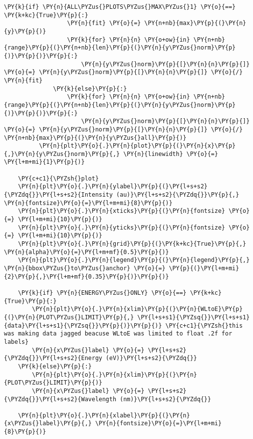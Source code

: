 \begin{tcolorbox}[breakable, size=fbox, boxrule=1pt, pad at break*=1mm,colback=cellbackground, colframe=cellborder]
\begin{Verbatim}[commandchars=\\\{\}]
              \PY{k}{if} \PY{n}{ALL\PYZus{}PLOTS\PYZus{}MAX\PYZus{}1} \PY{o}{==} \PY{k+kc}{True}\PY{p}{:}
                  \PY{n}{fit} \PY{o}{=} \PY{n+nb}{max}\PY{p}{(}\PY{n}{y}\PY{p}{)}
                  \PY{k}{for} \PY{n}{n} \PY{o+ow}{in} \PY{n+nb}{range}\PY{p}{(}\PY{n+nb}{len}\PY{p}{(}\PY{n}{y\PYZus{}norm}\PY{p}{)}\PY{p}{)}\PY{p}{:}
                      \PY{n}{y\PYZus{}norm}\PY{p}{[}\PY{n}{n}\PY{p}{]} \PY{o}{=} \PY{n}{y\PYZus{}norm}\PY{p}{[}\PY{n}{n}\PY{p}{]} \PY{o}{/} \PY{n}{fit}
              \PY{k}{else}\PY{p}{:}
                  \PY{k}{for} \PY{n}{n} \PY{o+ow}{in} \PY{n+nb}{range}\PY{p}{(}\PY{n+nb}{len}\PY{p}{(}\PY{n}{y\PYZus{}norm}\PY{p}{)}\PY{p}{)}\PY{p}{:}
                      \PY{n}{y\PYZus{}norm}\PY{p}{[}\PY{n}{n}\PY{p}{]} \PY{o}{=} \PY{n}{y\PYZus{}norm}\PY{p}{[}\PY{n}{n}\PY{p}{]} \PY{o}{/} \PY{n+nb}{max}\PY{p}{(}\PY{n}{y\PYZus{}all}\PY{p}{)}
          \PY{n}{plt}\PY{o}{.}\PY{n}{plot}\PY{p}{(}\PY{n}{x}\PY{p}{,}\PY{n}{y\PYZus{}norm}\PY{p}{,} \PY{n}{linewidth} \PY{o}{=} \PY{l+m+mi}{1}\PY{p}{)}

    \PY{c+c1}{\PYZsh{}plot}
    \PY{n}{plt}\PY{o}{.}\PY{n}{ylabel}\PY{p}{(}\PY{l+s+s2}{\PYZdq{}}\PY{l+s+s2}{Intensity (au)}\PY{l+s+s2}{\PYZdq{}}\PY{p}{,}  \PY{n}{fontsize}\PY{o}{=}\PY{l+m+mi}{8}\PY{p}{)}
    \PY{n}{plt}\PY{o}{.}\PY{n}{xticks}\PY{p}{(}\PY{n}{fontsize} \PY{o}{=} \PY{l+m+mi}{10}\PY{p}{)}
    \PY{n}{plt}\PY{o}{.}\PY{n}{yticks}\PY{p}{(}\PY{n}{fontsize} \PY{o}{=} \PY{l+m+mi}{10}\PY{p}{)}
    \PY{n}{plt}\PY{o}{.}\PY{n}{grid}\PY{p}{(}\PY{k+kc}{True}\PY{p}{,} \PY{n}{alpha}\PY{o}{=}\PY{l+m+mf}{0.5}\PY{p}{)}
    \PY{n}{plt}\PY{o}{.}\PY{n}{legend}\PY{p}{(}\PY{n}{legend}\PY{p}{,} \PY{n}{bbox\PYZus{}to\PYZus{}anchor} \PY{o}{=} \PY{p}{(}\PY{l+m+mi}{2}\PY{p}{,}\PY{l+m+mf}{0.35}\PY{p}{)}\PY{p}{)}
    
    \PY{k}{if} \PY{n}{ENERGY\PYZus{}ONLY} \PY{o}{==} \PY{k+kc}{True}\PY{p}{:}
        \PY{n}{plt}\PY{o}{.}\PY{n}{xlim}\PY{p}{(}\PY{n}{WLtoE}\PY{p}{(}\PY{n}{PLOT\PYZus{}LIMIT}\PY{p}{,} \PY{l+s+s1}{\PYZsq{}}\PY{l+s+s1}{data}\PY{l+s+s1}{\PYZsq{}}\PY{p}{)}\PY{p}{)} \PY{c+c1}{\PYZsh{}this was making data jagged beacuse WLtoE was limited to float .2f for labels}
        \PY{n}{x\PYZus{}label} \PY{o}{=} \PY{l+s+s2}{\PYZdq{}}\PY{l+s+s2}{Energy (eV)}\PY{l+s+s2}{\PYZdq{}}
    \PY{k}{else}\PY{p}{:}
        \PY{n}{plt}\PY{o}{.}\PY{n}{xlim}\PY{p}{(}\PY{n}{PLOT\PYZus{}LIMIT}\PY{p}{)}
        \PY{n}{x\PYZus{}label} \PY{o}{=} \PY{l+s+s2}{\PYZdq{}}\PY{l+s+s2}{Wavelength (nm)}\PY{l+s+s2}{\PYZdq{}}
        
    \PY{n}{plt}\PY{o}{.}\PY{n}{xlabel}\PY{p}{(}\PY{n}{x\PYZus{}label}\PY{p}{,} \PY{n}{fontsize}\PY{o}{=}\PY{l+m+mi}{8}\PY{p}{)}
    

\end{Verbatim}
\end{tcolorbox}
